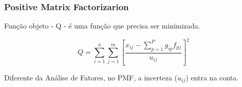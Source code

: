 \begin{frame}
  \frametitle{Positive Matrix Factorizarion}

  Função objeto - Q -  é uma função que precisa ser minimizada. 
 
  \begin{equation}
    Q = \sum_{i=1}^n \sum_{j=1}^m  \left[ \frac{ x_{ij} - \sum_{p=1}^{P} g_{ip}f_{pj}} {u_{ij}} \right] ^2
  \end{equation}

  Diferente da Análise de Fatores, no PMF, a incerteza ($u_{ij}$) entra na conta.
\end{frame}

\begin{frame}
  \frametitle{}
\end{frame}
